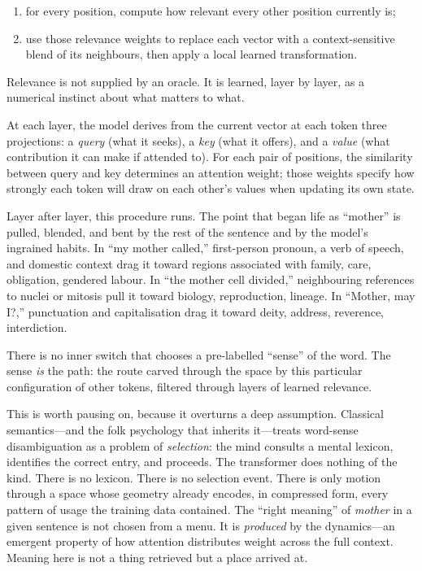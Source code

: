 \documentclass[12pt,a4paper]{book}
\begin{document}
\begin{enumerate}
  \item for every position, compute how relevant every other position currently is;
  \item use those relevance weights to replace each vector with a context-sensitive blend of its neighbours, then apply a local learned transformation.
\end{enumerate}

Relevance is not supplied by an oracle. It is learned, layer by layer, as a numerical instinct about what matters to what.

At each layer, the model derives from the current vector at each token three projections: a \emph{query} (what it seeks), a \emph{key} (what it offers), and a \emph{value} (what contribution it can make if attended to). For each pair of positions, the similarity between query and key determines an attention weight; those weights specify how strongly each token will draw on each other's values when updating its own state.

Layer after layer, this procedure runs. The point that began life as ``mother'' is pulled, blended, and bent by the rest of the sentence and by the model's ingrained habits. In ``my mother called,'' first-person pronoun, a verb of speech, and domestic context drag it toward regions associated with family, care, obligation, gendered labour. In ``the mother cell divided,'' neighbouring references to nuclei or mitosis pull it toward biology, reproduction, lineage. In ``Mother, may I?,'' punctuation and capitalisation drag it toward deity, address, reverence, interdiction.

There is no inner switch that chooses a pre-labelled ``sense'' of the word. The sense \emph{is} the path: the route carved through the space by this particular configuration of other tokens, filtered through layers of learned relevance.

This is worth pausing on, because it overturns a deep assumption. Classical semantics---and the folk psychology that inherits it---treats word-sense disambiguation as a problem of \emph{selection}: the mind consults a mental lexicon, identifies the correct entry, and proceeds. The transformer does nothing of the kind. There is no lexicon. There is no selection event. There is only motion through a space whose geometry already encodes, in compressed form, every pattern of usage the training data contained. The ``right meaning'' of \emph{mother} in a given sentence is not chosen from a menu. It is \emph{produced} by the dynamics---an emergent property of how attention distributes weight across the full context. Meaning here is not a thing retrieved but a place arrived at.
\end{document}
